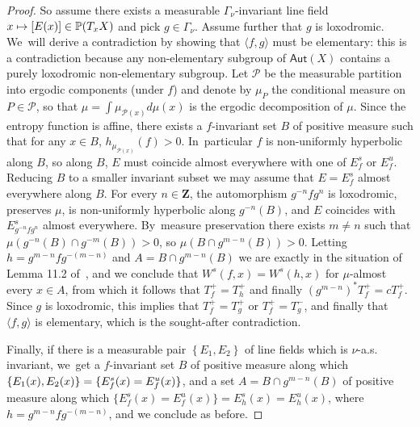 \documentclass[11pt]{article}
\newcommand\mto{\mathchoice{\longmapsto}{\mapsto}{\mapsto}{\mapsto}}
\newcommand{\set}[1]{\left\{#1\right\}}
\newcommand{\aset}[1]{\{#1\}}
\newcommand{\pp}{\mathbb{P}}\let\P\pp
\def\Z{\mathbf{Z}}
\newcommand\Aut{\mathsf{Aut}}
\theoremstyle{plain}
\theoremstyle{definition}
\numberwithin{equation}{section}
\begin{document}
\begin{proof}
So assume there exists a measurable $\Gamma_\nu$-invariant line field
$x\mto [E(x)]\in \pp(T_xX)$ and pick $g\in \Gamma_\nu$. Assume further that $g$ is loxodromic. We~will derive a contradiction by
showing that $\langle f, g\rangle$ must be elementary: this is a contradiction because
any non-elementary subgroup of $\Aut(X)$ contains a purely loxodromic non-elementary subgroup.
Let $\mathcal P$ be the measurable partition into ergodic components (under $f$) and
denote by $\mu_P$ the conditional
measure on $P\in \mathcal P$, so
that $\mu = \int \mu_{\mathcal P(x)} d\mu(x)$ is the ergodic decomposition of $\mu$.
Since the entropy function is affine, there exists a $f$-invariant
set $B$ of positive measure such that
for any $x\in B$, $h_{\mu_{\mathcal P(x)}}(f)>0$. In~particular $f$ is non-uniformly hyperbolic along $B$, so
along $B$, $E$ must coincide almost everywhere with one of $E^s_f$ or $E^u_f$. Reducing $B$ to a smaller
invariant subset we may
assume that $E = E^s_f$ almost everywhere along $B$.
For every $n\in \Z$, the automorphism $g^{-n} f g^n$ is loxodromic, preserves $\mu$, is
non-uniformly hyperbolic along $g^{-n}(B)$, and $E$ coincides with $E^s_{g^{-n}fg^n}$ almost everywhere. By~measure preservation
there exists $m\neq n$ such that $\mu(g^{-n}(B)\cap g^{-m}(B))>0$, so
$\mu(B\cap g^{m-n}(B))>0$. Letting $h = g^{m-n}fg^{-(m-n)}$ and
$A = B\cap g^{m-n}(B)$ we are exactly in the situation of Lemma 11.2 of~\cite{stiffness}, and
we conclude that $W^s(f, x) = W^s(h, x)$ for $\mu$-almost every $x\in A$, from which it follows that
$T^+_f= T^+_h$ and finally $(g^{m-n})^*T_f^+ = c T^+_f$. Since $g$ is loxodromic, this implies
that $T^+_f = T^+_g$ or $T^+_f = T^-_g$, and finally that $\langle f, g\rangle$ is elementary, which is
the sought-after contradiction.\enlargethispage{.5\baselineskip}%

Finally, if there is a measurable pair $\set{E_1, E_2}$ of line fields which is $\nu$-a.s.
invariant, we~get a $f$-invariant set $B$ of positive measure along which
$\aset{E_1(x), E_2(x) } = \aset{E^s_f(x) =\nobreak E^u_f(x)}$, and a set
$A = B\cap g^{m-n}(B)$ of positive measure along which
$\aset{E^s_f(x) = E^u_f(x)} = {E^s_h(x) = E^u_h(x)}$, where $h = g^{m-n}fg^{-(m-n)}$, and we conclude as before.
\end{proof}

\end{document}
